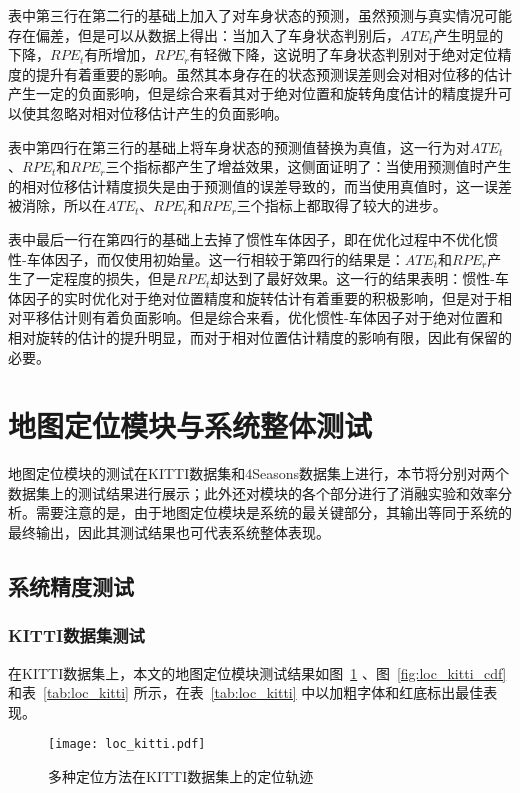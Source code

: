 表中第三行在第二行的基础上加入了对车身状态的预测，虽然预测与真实情况可能存在偏差，但是可以从数据上得出：当加入了车身状态判别后，$ATE_t$产生明显的下降，$RPE_t$有所增加，$RPE_r$有轻微下降，这说明了车身状态判别对于绝对定位精度的提升有着重要的影响。虽然其本身存在的状态预测误差则会对相对位移的估计产生一定的负面影响，但是综合来看其对于绝对位置和旋转角度估计的精度提升可以使其忽略对相对位移估计产生的负面影响。

表中第四行在第三行的基础上将车身状态的预测值替换为真值，这一行为对$ATE_t$、$RPE_t$和$RPE_r$三个指标都产生了增益效果，这侧面证明了：当使用预测值时产生的相对位移估计精度损失是由于预测值的误差导致的，而当使用真值时，这一误差被消除，所以在$ATE_t$、$RPE_t$和$RPE_r$三个指标上都取得了较大的进步。

表中最后一行在第四行的基础上去掉了惯性车体因子，即在优化过程中不优化惯性-车体因子，而仅使用初始量。这一行相较于第四行的结果是：$ATE_t$和$RPE_r$产生了一定程度的损失，但是$RPE_t$却达到了最好效果。这一行的结果表明：惯性-车体因子的实时优化对于绝对位置精度和旋转估计有着重要的积极影响，但是对于相对平移估计则有着负面影响。但是综合来看，优化惯性-车体因子对于绝对位置和相对旋转的估计的提升明显，而对于相对位置估计精度的影响有限，因此有保留的必要。

\section{地图定位模块与系统整体测试}
地图定位模块的测试在KITTI数据集和4Seasons数据集上进行，本节将分别对两个数据集上的测试结果进行展示；此外还对模块的各个部分进行了消融实验和效率分析。需要注意的是，由于地图定位模块是系统的最关键部分，其输出等同于系统的最终输出，因此其测试结果也可代表系统整体表现。

\subsection{系统精度测试}
\subsubsection{KITTI数据集测试}

在KITTI数据集上，本文的地图定位模块测试结果如图~\ref{fig:loc_kitti} 、图~\ref{fig:loc_kitti_cdf} 和表~\ref{tab:loc_kitti} 所示，在表~\ref{tab:loc_kitti} 中以加粗字体和红底标出最佳表现。

\begin{figure}
  \centering
  \texttt{[image: loc\_kitti.pdf]}
  \caption{多种定位方法在KITTI数据集上的定位轨迹}
  \label{fig:loc_kitti}
\end{figure}


